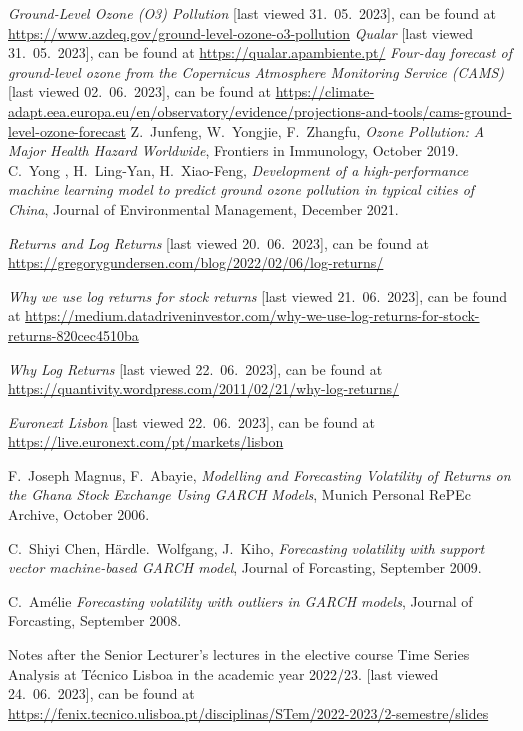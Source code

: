 \documentclass{article}
\begin{document}
\begin{thebibliography}{99}
   \emph{Ground-Level Ozone (O3) Pollution}
   [last viewed 31.~05.~2023], can be found at 
   \url{https://www.azdeq.gov/ground-level-ozone-o3-pollution} 
    \emph{Qualar}
   [last viewed 31.~05.~2023], can be found at 
   \url{https://qualar.apambiente.pt/} 
   \emph{Four-day forecast of ground-level ozone from the Copernicus Atmosphere Monitoring Service (CAMS)}
   [last viewed 02.~06.~2023], can be found at 
   \url{https://climate-adapt.eea.europa.eu/en/observatory/evidence/projections-and-tools/cams-ground-level-ozone-forecast} 
    Z.~Junfeng, W.~Yongjie, F.~Zhangfu, \emph{Ozone Pollution: A Major Health Hazard Worldwide}, Frontiers in Immunology, October 2019.
    C.~Yong , H.~Ling-Yan, H.~Xiao-Feng, \emph{Development of a high-performance machine learning model to predict ground ozone pollution in typical cities of China}, Journal of Environmental Management, December 2021.


    \emph{Returns and Log Returns}
       [last viewed 20.~06.~2023], can be found at 
   \url{https://gregorygundersen.com/blog/2022/02/06/log-returns/} 

    \emph{Why we use log returns for stock returns}
       [last viewed 21.~06.~2023], can be found at 
   \url{https://medium.datadriveninvestor.com/why-we-use-log-returns-for-stock-returns-820cec4510ba} 

    \emph{Why Log Returns}
       [last viewed 22.~06.~2023], can be found at 
   \url{https://quantivity.wordpress.com/2011/02/21/why-log-returns/} 

    \emph{Euronext Lisbon}
   [last viewed 22.~06.~2023], can be found at 
   \url{https://live.euronext.com/pt/markets/lisbon} 

    F.~Joseph Magnus, F.~Abayie, \emph{Modelling and Forecasting Volatility of Returns on the Ghana Stock Exchange Using GARCH Models}, Munich Personal RePEc Archive, October 2006.

    C.~Shiyi Chen, Härdle.~Wolfgang, J.~Kiho, \emph{Forecasting volatility with support vector machine-based GARCH model}, Journal of Forcasting, September 2009.

    C.~Amélie  \emph{Forecasting volatility with outliers in GARCH models}, Journal of Forcasting, September 2008.

    Notes after the Senior Lecturer's lectures in the elective course Time Series Analysis at Técnico Lisboa in the academic year 2022/23. [last viewed 24.~06.~2023], can be found at 
   \url{https://fenix.tecnico.ulisboa.pt/disciplinas/STem/2022-2023/2-semestre/slides} 

\end{thebibliography}
\end{document}
